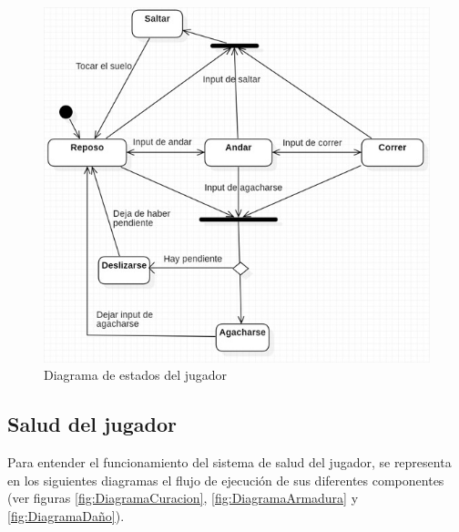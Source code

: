 \begin{figure}[h]
    \centering
    \includegraphics[scale=0.5]{img/PlayerStatesDiagram.jpg}
    \caption{Diagrama de estados del jugador}
    \label{fig:EstadosJugador}
    \end{figure}

\subsection{Salud del jugador}
Para entender el funcionamiento del sistema de salud del jugador, se representa en los siguientes diagramas el flujo de ejecución de sus diferentes componentes (ver figuras \ref{fig:DiagramaCuracion}, \ref{fig:DiagramaArmadura} y \ref{fig:DiagramaDaño}).

